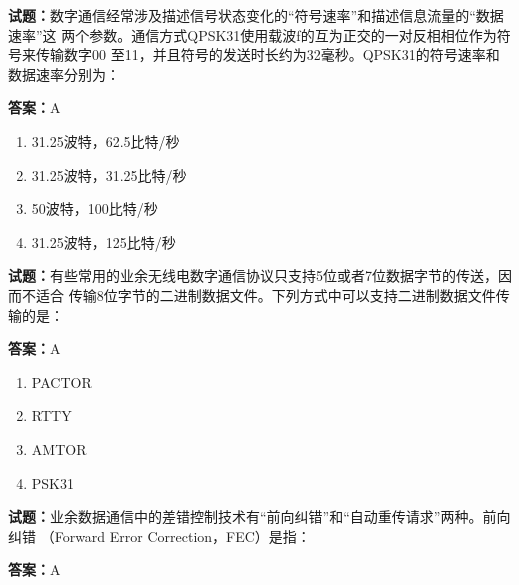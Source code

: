 \documentclass{ctexbook}
\begin{document}
\textbf{试题：}数字通信经常涉及描述信号状态变化的“符号速率”和描述信息流量的“数据速率”这
两个参数。通信方式QPSK31使用载波f的互为正交的一对反相相位作为符号来传输数字00
至11，并且符号的发送时长约为32毫秒。QPSK31的符号速率和数据速率分别为： 

\textbf{答案：}A 

\begin{enumerate}[leftmargin=3em]
  \item 31.25波特，62.5比特/秒 

  \item 31.25波特，31.25比特/秒 

  \item 50波特，100比特/秒 

  \item 31.25波特，125比特/秒 

\end{enumerate}





\vspace{1em}

\textbf{试题：}有些常用的业余无线电数字通信协议只支持5位或者7位数据字节的传送，因而不适合
传输8位字节的二进制数据文件。下列方式中可以支持二进制数据文件传输的是： 

\textbf{答案：}A 

\begin{enumerate}[leftmargin=3em]
  \item PACTOR 

  \item RTTY 

  \item AMTOR 

  \item PSK31 

\end{enumerate}





\vspace{1em}

\textbf{试题：}业余数据通信中的差错控制技术有“前向纠错”和“自动重传请求”两种。前向纠错
（Forward Error Correction，FEC）是指： 

\textbf{答案：}A 
\end{document}

